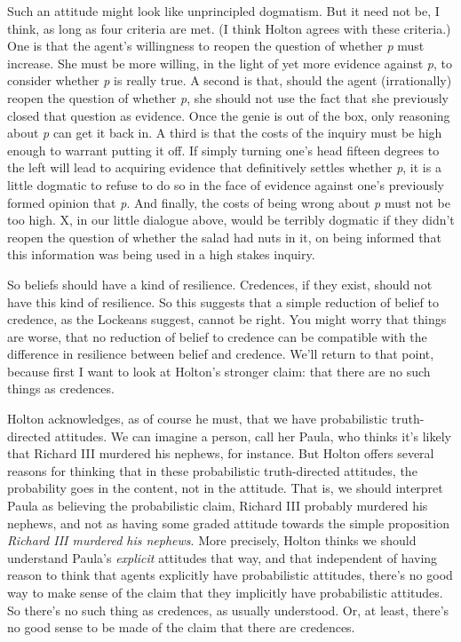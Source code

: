 \documentclass[
  11pt,
  letterpaper,
  DIV=11,
  numbers=noendperiod,
  twoside]{scrartcl}
\begin{document}
Such an attitude might look like unprincipled dogmatism. But it need not
be, I think, as long as four criteria are met. (I think Holton agrees
with these criteria.) One is that the agent's willingness to reopen the
question of whether \emph{p} must increase. She must be more willing, in
the light of yet more evidence against \emph{p}, to consider whether
\emph{p} is really true. A second is that, should the agent
(irrationally) reopen the question of whether \emph{p}, she should not
use the fact that she previously closed that question as evidence. Once
the genie is out of the box, only reasoning about \emph{p} can get it
back in. A third is that the costs of the inquiry must be high enough to
warrant putting it off. If simply turning one's head fifteen degrees to
the left will lead to acquiring evidence that definitively settles
whether \emph{p}, it is a little dogmatic to refuse to do so in the face
of evidence against one's previously formed opinion that \emph{p}. And
finally, the costs of being wrong about \emph{p} must not be too high.
X, in our little dialogue above, would be terribly dogmatic if they
didn't reopen the question of whether the salad had nuts in it, on being
informed that this information was being used in a high stakes inquiry.

So beliefs should have a kind of resilience. Credences, if they exist,
should not have this kind of resilience. So this suggests that a simple
reduction of belief to credence, as the Lockeans suggest, cannot be
right. You might worry that things are worse, that no reduction of
belief to credence can be compatible with the difference in resilience
between belief and credence. We'll return to that point, because first I
want to look at Holton's stronger claim: that there are no such things
as credences.

Holton acknowledges, as of course he must, that we have probabilistic
truth-directed attitudes. We can imagine a person, call her Paula, who
thinks it's likely that Richard III murdered his nephews, for instance.
But Holton offers several reasons for thinking that in these
probabilistic truth-directed attitudes, the probability goes in the
content, not in the attitude. That is, we should interpret Paula as
believing the probabilistic claim, Richard III probably murdered his
nephews, and not as having some graded attitude towards the simple
proposition \emph{Richard III murdered his nephews}. More precisely,
Holton thinks we should understand Paula's \emph{explicit} attitudes
that way, and that independent of having reason to think that agents
explicitly have probabilistic attitudes, there's no good way to make
sense of the claim that they implicitly have probabilistic attitudes. So
there's no such thing as credences, as usually understood. Or, at least,
there's no good sense to be made of the claim that there are credences.
\end{document}
